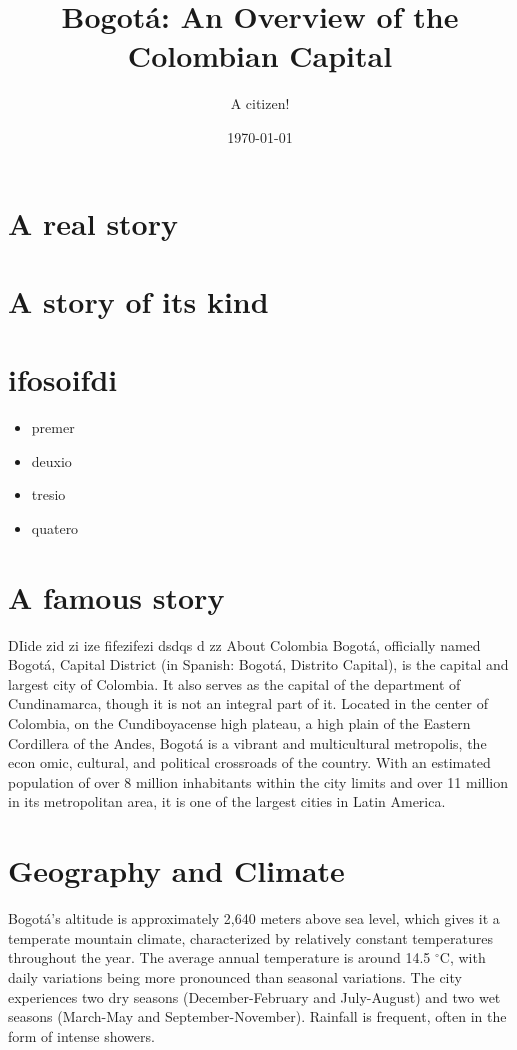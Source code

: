 \documentclass{article}
\title{Bogotá: An Overview of the Colombian Capital}
\author{A citizen!}
\date{\today}
\begin{document}
\maketitle

\section{A real story}

\section{A story of its kind}

\section{ifosoifdi}

\begin{itemize}
    \item premer
    \item deuxio
    \item tresio
    \item quatero
\end{itemize}

\section{A famous story}

DIide zid zi ize
fifezifezi
dsdqs
d
zz
About Colombia
Bogotá, officially named Bogotá, Capital District (in Spanish: Bogotá, Distrito Capital), is the capital and largest city of Colombia. It also serves as the capital of the department of Cundinamarca, though it is not an integral part of it. Located in the center of Colombia, on the Cundiboyacense high plateau, a high plain of the Eastern Cordillera of the Andes, Bogotá is a vibrant and multicultural metropolis, the econ
omic, cultural, and political crossroads of the country. With an estimated population of over 8 million inhabitants within the city limits and over 11 million in its metropolitan area, it is one of the largest cities in Latin America.

\section{Geography and Climate}
Bogotá's altitude is approximately 2,640 meters above sea level, which gives it a temperate mountain climate, characterized by relatively constant temperatures throughout the year. The average annual temperature is around 14.5 $^\circ$C, with daily variations being more pronounced than seasonal variations. The city experiences two dry seasons (December-February and July-August) and two wet seasons (March-May and September-November). Rainfall is frequent, often in the form of intense showers.
\end{document}

